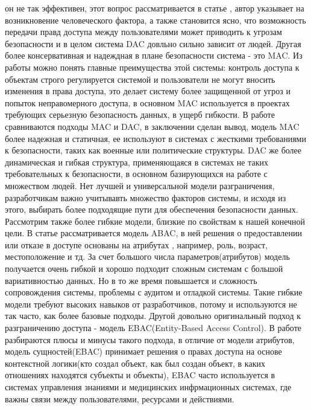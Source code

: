 \documentclass[14pt, a4paper]{extarticle}
\begin{document}
он не так эффективен, этот вопрос рассматривается в статье \cite{Ellison2000}, автор указывает на возникновение человеческого фактора, а также
становится ясно, что возможность передачи правд доступа между пользователями может приводить к угрозам безопасности и в целом система DAC довльно сильно зависит от людей.
Другая более консервативная и надеждная в плане безопасности система - это MAC. Из работы \cite{FerraioloSandhu2002} можно понять главные преимущества этой системы: контроль доступа к объектам строго регулируется системой
и пользователи не могут вносить изменения в права доступа, это делает систему более защищенной от угроз и попыток неправомерного доступа, в основном MAC используется в проектах требующих серьезную безопасность данных, в ущерб гибкости.
В работе \cite{HaleNgu1994} сравниваются подходы MAC и DAC, в заключении сделан вывод, модель MAC более надежная и статичная, ее используют в системах с жесткими требованиями к безопасности,
таких как военные или политические структуры. DAC же более динамическая и гибкая структура, применяющаяся в системах не таких требовательных к безопасности, в основном базирующихся на работе с множеством людей.
Нет лучшей и универсальной модели разграничения, разработчикам важно учитывавть множество факторов системы, и исходя из этого, выбирать более подходящие пути для обеспечения безопасности данных.
Рассмотрим также более гибкие модели, близкие по свойствам к нашей конечной цели. В статье \cite{BarkaSandhu2012} рассматривается модель ABAC, в ней решения о предоставлении или отказе в  доступе основаны на атрибутах
, например, роль, возраст, местоположение и тд. За счет большого числа параметров(атрибутов) модель получается очень гибкой и хорошо подходит сложным системам с большой вариативностью данных. Но в то же время повышается и сложность сопровождения системы, проблемы с аудитом и отладкой системы.
Такие гибкие модели требуют высоких навыков от разработчиков, потому и используются не так часто, как более базовые подходы.
Другой довольно оригинальный подход к разграничению доступа - модель EBAC(Entity-Based Access Control). В работе \cite{LiYu2006} разбираются плюсы и минусы такого подхода, в отличие от модели атрибутов, модель сущностей(EBAC)
принимает решения о правах доступа на основе контекстной логики(кто создал объект, как был создан объект, в каких отношениях находятся субъекты и объекты), EBAC часто используется в системах управления знаниями и медицинских инфрмационных системах, где важны связи между пользователями, ресурсами и действиями.
\end{document}
